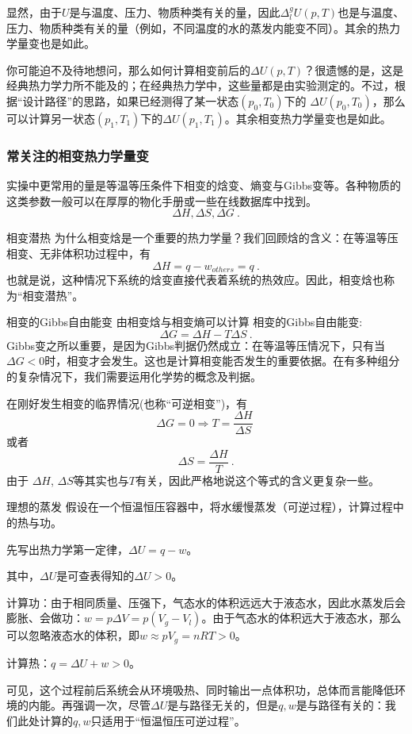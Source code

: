 显然，由于$U$是与温度、压力、物质种类有关的量，因此$\Delta ^ g_l U (p,T)$也是与温度、压力、物质种类有关的量（例如，不同温度的水的蒸发内能变不同）。其余的热力学量变也是如此。

你可能迫不及待地想问，那么如何计算相变前后的$\Delta U (p,T)$？很遗憾的是，这是经典热力学力所不能及的；在经典热力学中，这些量都是由实验测定的。不过，根据“设计路径”的思路，如果已经测得了某一状态$(p_0,T_0)$下的 $\Delta U (p_0,T_0)$，那么可以计算另一状态$(p_1,T_1)$下的$\Delta U (p_1,T_1)$。其余相变热力学量变也是如此。

\subsubsection{常关注的相变热力学量变}
实操中更常用的量是等温等压条件下相变的焓变、熵变与Gibbs变等。各种物质的这类参数一般可以在厚厚的物化手册或一些在线数据库中找到。
$$
\Delta H, \Delta  S, \Delta G~.
$$

\begin{example}{相变潜热}
为什么相变焓是一个重要的热力学量？我们回顾焓的含义：在等温等压相变、无非体积功过程中，有
$$
\Delta H = q - w_{others} = q~.
$$
也就是说，这种情况下系统的焓变直接代表着系统的热效应。因此，相变焓也称为“相变潜热”。
\end{example}

\begin{example}{相变的Gibbs自由能变}
由相变焓与相变熵可以计算 相变的Gibbs自由能变:
$$
\Delta G = \Delta H - T \Delta S~.
$$
Gibbs变之所以重要，是因为Gibbs判据仍然成立：在等温等压情况下，只有当$\Delta G<0$时，相变才会发生。这也是计算相变能否发生的重要依据。在有多种组分的复杂情况下，我们需要运用化学势的概念及判据。

在刚好发生相变的临界情况(也称“可逆相变”)，有
$$
\Delta G = 0 \Rightarrow T = \frac{\Delta H}{\Delta S}~
$$
或者
$$
\Delta S = \frac{\Delta H}{T}~.
$$
由于 $\Delta H$, $\Delta S$等其实也与$T$有关，因此严格地说这个等式的含义更复杂一些。
\end{example}

\begin{example}{理想的蒸发}
假设在一个恒温恒压容器中，将水缓慢蒸发（可逆过程），计算过程中的热与功。

先写出热力学第一定律，$\Delta U = q - w$。

其中，$\Delta U$是可查表得知的$\Delta U>0$。

计算功：由于相同质量、压强下，气态水的体积远远大于液态水，因此水蒸发后会膨胀、会做功：$w=p\Delta V = p(V_g - V_l)$。由于气态水的体积远大于液态水，那么可以忽略液态水的体积，即$w \approx p V_g = nRT > 0$。

计算热：$q = \Delta U + w > 0$。

可见，这个过程前后系统会从环境吸热、同时输出一点体积功，总体而言能降低环境的内能。再强调一次，尽管$\Delta U$是与路径无关的，但是$q, w$是与路径有关的：我们此处计算的$q, w$只适用于“恒温恒压可逆过程”。
\end{example}

